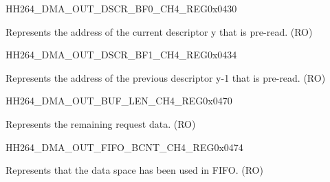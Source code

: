     
    \begin{register}{H}{H264\_DMA\_OUT\_DSCR\_BF0\_CH4\_REG}{0x0430}\label{regdesc:H264DMAOUTDSCRBF0CH4REG}
    \regnewline%
    \begin{regdesc}\begin{reglist}
    \label{fielddesc:H264DMAOUTLINKDSCRBF0CH4}\item [H264\_DMA\_OUTLINK\_DSCR\_BF0\_CH4] Represents the address of the current descriptor y that is pre-read. (RO)
    \end{reglist}\end{regdesc}
    \end{register}
    
    
    \begin{register}{H}{H264\_DMA\_OUT\_DSCR\_BF1\_CH4\_REG}{0x0434}\label{regdesc:H264DMAOUTDSCRBF1CH4REG}
    \regnewline%
    \begin{regdesc}\begin{reglist}
    \label{fielddesc:H264DMAOUTLINKDSCRBF1CH4}\item [H264\_DMA\_OUTLINK\_DSCR\_BF1\_CH4] Represents the address of the previous descriptor y-1 that is pre-read. (RO)
    \end{reglist}\end{regdesc}
    \end{register}
    
    \begin{register}{H}{H264\_DMA\_OUT\_BUF\_LEN\_CH4\_REG}{0x0470}\label{regdesc:H264DMAOUTBUFLENCH4REG}
    \regnewline%
    \begin{regdesc}\begin{reglist}
    \label{fielddesc:H264DMAOUTCMDFIFOBUFLENHBCH4}\item [H264\_DMA\_OUT\_CMDFIFO\_BUF\_LEN\_HB\_CH4] Represents the remaining request data. (RO)
    \end{reglist}\end{regdesc}
    \end{register}
    
    
    \begin{register}{H}{H264\_DMA\_OUT\_FIFO\_BCNT\_CH4\_REG}{0x0474}\label{regdesc:H264DMAOUTFIFOBCNTCH4REG}
    \regnewline%
    \begin{regdesc}\begin{reglist}
    \label{fielddesc:H264DMAOUTCMDFIFOOUTFIFOBCNTCH4}\item [H264\_DMA\_OUT\_CMDFIFO\_OUTFIFO\_BCNT\_CH4] Represents that the data space has been used in FIFO. (RO)
    \end{reglist}\end{regdesc}
    \end{register}
    

